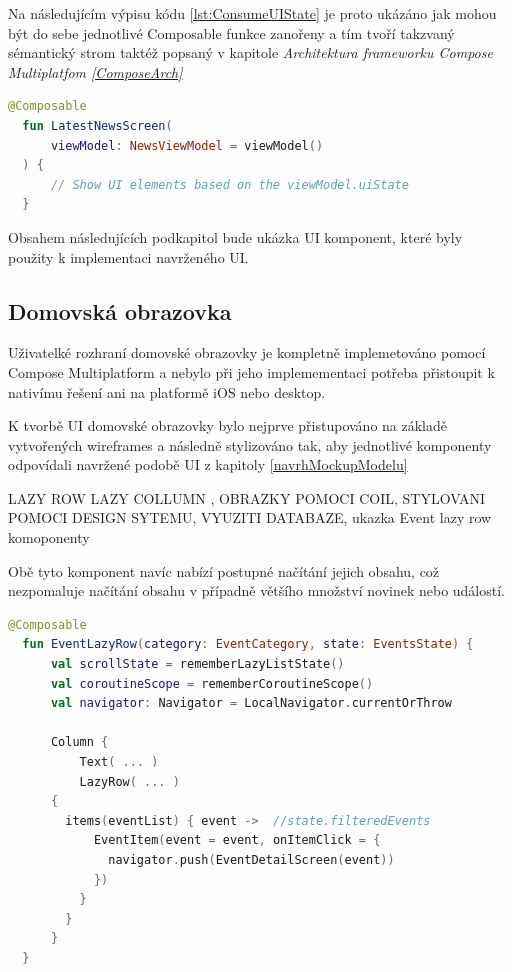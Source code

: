 Na následujícím výpisu kódu \ref{lst:ConsumeUIState} je proto ukázáno jak mohou být do sebe jednotlivé Composable funkce zanořeny a tím tvoří
takzvaný sémantický strom taktéž popsaný v kapitole \textit{Architektura frameworku Compose Multiplatfom \ref{ComposeArch}}

\begin{lstlisting}[caption={Popis UI widgetů pomocí jazyka Kotlin}, label={lst:ConsumeUIState}, language=Kotlin]
  @Composable
  fun LatestNewsScreen(
      viewModel: NewsViewModel = viewModel()
  ) {
      // Show UI elements based on the viewModel.uiState
  }
\end{lstlisting}




Obsahem následujících podkapitol bude ukázka UI komponent, které byly použity k implementaci navrženého UI.

\subsection{Domovská obrazovka}
Uživatelké rozhraní domovské obrazovky je kompletně implemetováno pomocí Compose Multiplatform a nebylo při jeho implemementaci potřeba
přistoupit k nativímu řešení ani na platformě iOS nebo desktop. 

K tvorbě UI domovské obrazovky bylo nejprve přistupováno na základě vytvořených wireframes a následně stylizováno tak, aby 
jednotlivé komponenty odpovídali navržené podobě UI z kapitoly \ref{navrhMockupModelu}

LAZY ROW LAZY COLLUMN , OBRAZKY POMOCI COIL, STYLOVANI POMOCI DESIGN SYTEMU, VYUZITI DATABAZE, ukazka Event lazy row komoponenty

Obě tyto komponent navíc nabízí postupné načítání jejich obsahu, což nezpomaluje načítání obsahu v případně většího množství novinek
nebo událostí.

\begin{lstlisting}[caption={Coil}, label={lst:Coil3}, language=Kotlin]
  @Composable
  fun EventLazyRow(category: EventCategory, state: EventsState) {
      val scrollState = rememberLazyListState()
      val coroutineScope = rememberCoroutineScope()
      val navigator: Navigator = LocalNavigator.currentOrThrow
  
      Column {
          Text( ... )
          LazyRow( ... ) 
      {  
        items(eventList) { event ->  //state.filteredEvents
            EventItem(event = event, onItemClick = {
              navigator.push(EventDetailScreen(event))
            })
          }
        }
      }
  }
\end{lstlisting}

